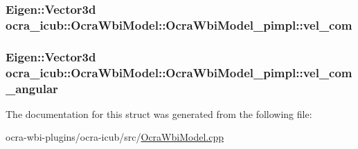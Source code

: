 \hypertarget{structOcraWbiModel_1_1OcraWbiModel__pimpl_a96c3cdb51b2a2b69c0738605c30e1b2e}{
\subsubsection[{vel\-\_\-com}]{\setlength{\rightskip}{0pt plus 5cm}\-Eigen\-::\-Vector3d {\bf ocra\-\_\-icub\-::\-Ocra\-Wbi\-Model\-::\-Ocra\-Wbi\-Model\-\_\-pimpl\-::vel\-\_\-com}}}\label{structOcraWbiModel_1_1OcraWbiModel__pimpl_a96c3cdb51b2a2b69c0738605c30e1b2e}
\hypertarget{structOcraWbiModel_1_1OcraWbiModel__pimpl_a696d73e62837978589a2730c8feb325c}{
\subsubsection[{vel\-\_\-com\-\_\-angular}]{\setlength{\rightskip}{0pt plus 5cm}\-Eigen\-::\-Vector3d {\bf ocra\-\_\-icub\-::\-Ocra\-Wbi\-Model\-::\-Ocra\-Wbi\-Model\-\_\-pimpl\-::vel\-\_\-com\-\_\-angular}}}\label{structOcraWbiModel_1_1OcraWbiModel__pimpl_a696d73e62837978589a2730c8feb325c}


\-The documentation for this struct was generated from the following file\-:\begin{DoxyCompactItemize}
\item 
ocra-\/wbi-\/plugins/ocra-\/icub/src/\hyperlink{OcraWbiModel_8cpp}{\-Ocra\-Wbi\-Model.\-cpp}\end{DoxyCompactItemize}
